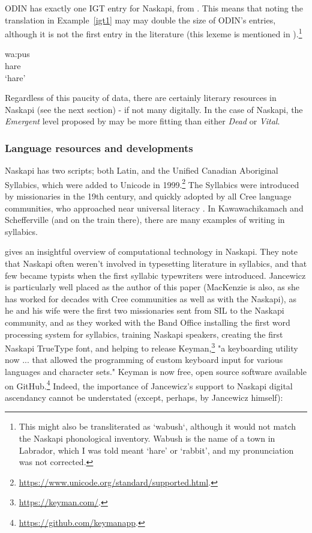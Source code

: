 ODIN has exactly one IGT entry for Naskapi, from \citep{richards2004syntax}. This means that noting the translation in Example~\ref{igt1} may may double the size of ODIN's entries, although it is not the first entry in the literature (this lexeme is mentioned in \citet{macKenzie1980towards}).\footnote{This might also be transliterated as `wabush`, although it would not match the Naskapi phonological inventory. Wabush is the name of a town in Labrador, which I was told meant `hare' or `rabbit', and my pronunciation was not corrected.}

\begin{exe}
\ex
\gll wa:pus\\
hare\\
\trans `hare'
\label{igt1}
\end{exe}

Regardless of this paucity of data, there are certainly literary resources in Naskapi (see the next section) - if not many digitally. In the case of Naskapi, the {\it Emergent} level proposed by \citet{gibson2016assessing} may be more fitting than either {\it Dead} or {\it Vital}.

\subsubsection{Language resources and developments}
Naskapi has two scripts; both Latin, and the Unified Canadian Aboriginal Syllabics, which were added to Unicode in 1999.\footnote{\href{https://www.unicode.org/standard/supported.html}{https://www.unicode.org/standard/supported.html}. } The Syllabics were introduced by missionaries in the 19th century, and quickly adopted by all Cree language communities, who approached near universal literacy \citep{bennett1991cree}. In Kawawachikamach and Schefferville (and on the train there), there are many examples of writing in syllabics.

\citet{jancewicz2002applied} gives an insightful overview of computational technology in Naskapi. They note that Naskapi often weren't involved in typesetting literature in syllabics, and that few became typists when the first syllabic typewriters were introduced. Jancewicz is particularly well placed as the author of this paper (MacKenzie is also, as she has worked for decades with Cree communities as well as with the Naskapi), as he and his wife were the first two missionaries sent from SIL to the Naskapi community, and as they worked with the Band Office installing the first word processing system for syllabics, training Naskapi speakers, creating the first Naskapi TrueType font, and helping to release Keyman,\footnote{\href{https://keyman.com/}{https://keyman.com/}. } "a keyboarding utility now ... that allowed the programming of custom keyboard input for various languages and character sets." \citep[85]{jancewicz2002applied} Keyman is now free, open source software available on GitHub.\footnote{\href{https://github.com/keymanapp}{https://github.com/keymanapp}. } Indeed, the importance of Jancewicz's support to Naskapi digital ascendancy cannot be understated (except, perhaps, by Jancewicz himself):

